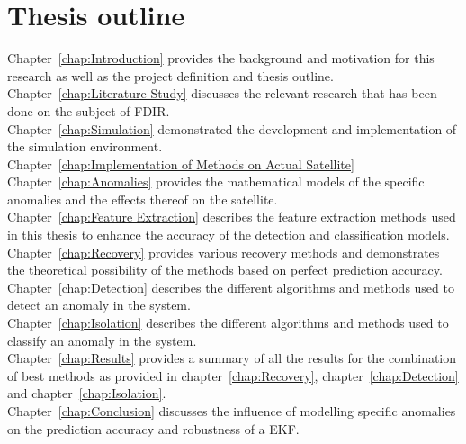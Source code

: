\section{Thesis outline}
Chapter~\ref{chap:Introduction} provides the background and motivation for this research as well as the project definition and thesis outline.
\\
Chapter~\ref{chap:Literature Study} discusses the relevant research that has been done on the subject of FDIR.
\\
Chapter~\ref{chap:Simulation} demonstrated the development and implementation of the simulation environment.
\\
Chapter~\ref{chap:Implementation of Methods on Actual Satellite} 
\\
Chapter~\ref{chap:Anomalies} provides the mathematical models of the specific anomalies and the effects thereof on the satellite.
\\
Chapter~\ref{chap:Feature Extraction} describes the feature extraction methods used in this thesis to enhance the accuracy of the detection and classification models.
\\
Chapter~\ref{chap:Recovery} provides various recovery methods and demonstrates the theoretical possibility of the methods based on perfect prediction accuracy.
\\
Chapter~\ref{chap:Detection} describes the different algorithms and methods used to detect an anomaly in the system.
\\
Chapter~\ref{chap:Isolation} describes the different algorithms and methods used to classify an anomaly in the system.
\\
Chapter~\ref{chap:Results} provides a summary of all the results for the combination of best methods as provided in chapter~\ref{chap:Recovery}, chapter~\ref{chap:Detection} and chapter~\ref{chap:Isolation}.
\\
Chapter~\ref{chap:Conclusion} discusses the influence of modelling specific anomalies on the prediction accuracy and robustness of a EKF.
